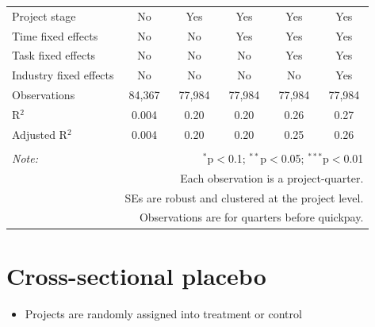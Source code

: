 \documentclass[
]{article}
\providecommand{\tightlist}{%
  \setlength{\itemsep}{0pt}\setlength{\parskip}{0pt}}
\begin{document}
\begin{table}[H]
\begin{tabular}{@{\extracolsep{-2pt}}lccccc}
Project stage & No & Yes & Yes & Yes & Yes \\ 
Time fixed effects & No & No & Yes & Yes & Yes \\ 
Task fixed effects & No & No & No & Yes & Yes \\ 
Industry fixed effects & No & No & No & No & Yes \\ 
Observations & 84,367 & 77,984 & 77,984 & 77,984 & 77,984 \\ 
R$^{2}$ & 0.004 & 0.20 & 0.20 & 0.26 & 0.27 \\ 
Adjusted R$^{2}$ & 0.004 & 0.20 & 0.20 & 0.25 & 0.26 \\ 
\hline 
\hline \\[-1.8ex] 
\textit{Note:}  & \multicolumn{5}{r}{$^{*}$p$<$0.1; $^{**}$p$<$0.05; $^{***}$p$<$0.01} \\ 
 & \multicolumn{5}{r}{Each observation is a project-quarter.} \\ 
 & \multicolumn{5}{r}{SEs are robust and clustered at the project level.} \\ 
 & \multicolumn{5}{r}{Observations are for quarters before quickpay.} \\ 
\end{tabular} 
\end{table}

\hypertarget{cross-sectional-placebo}{%
\section{Cross-sectional placebo}\label{cross-sectional-placebo}}

\begin{itemize}
\tightlist
\item
  Projects are randomly assigned into treatment or control
\end{itemize}
\end{document}
